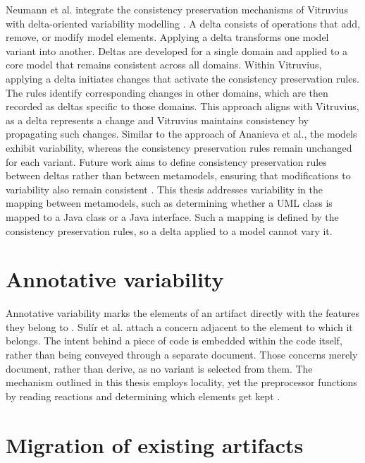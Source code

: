 Neumann et al. integrate the consistency preservation mechanisms of Vitruvius with delta-oriented variability modelling \cite{neumann2025towards}.
A delta consists of operations that add, remove, or modify model elements. Applying a delta transforms one model variant into another.
Deltas are developed for a single domain and applied to a core model that remains consistent across all domains.
Within Vitruvius, applying a delta initiates changes that activate the consistency preservation rules.
The rules identify corresponding changes in other domains, which are then recorded as deltas specific to those domains.
This approach aligns with Vitruvius, as a delta represents a change and Vitruvius maintains consistency by propagating such changes.
Similar to the approach of Ananieva et al., the models exhibit variability, whereas the consistency preservation rules remain unchanged for each variant.
Future work aims to define consistency preservation rules between deltas rather than between metamodels, ensuring that modifications to variability also remain consistent \cite{neumann2025towards}.
This thesis addresses variability in the mapping between metamodels, such as determining whether a UML class is mapped to a Java class or a Java interface.
Such a mapping is defined by the consistency preservation rules, so a delta applied to a model cannot vary it.

\section{Annotative variability}
\label{sec:RelatedWork:AnnotativeVariability}

Annotative variability marks the elements of an artifact directly with the features they belong to \cite{kaestner2008granularity}.
Sulír et al. attach a concern adjacent to the element to which it belongs.
The intent behind a piece of code is embedded within the code itself, rather than being conveyed through a separate document.
Those concerns merely document, rather than derive, as no variant is selected from them.
The mechanism outlined in this thesis employs locality, yet the preprocessor functions by reading reactions and determining which elements get kept \cite{sulir2016recording}.

\section{Migration of existing artifacts}
\label{sec:RelatedWork:MigrationOfExistingArtifacts}

